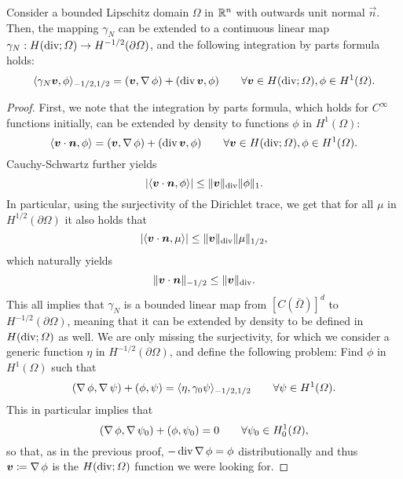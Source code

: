 \begin{theorem}\label{thm:normal-trace}
Consider a bounded Lipschitz domain $\Omega$ in $\mathbb{R}^n$ with outwards unit normal $\vec n$. Then, the mapping $\gamma_N$ can be extended to a continuous linear map $\gamma_N: H(\operatorname{\text{div}}; \Omega) \to H^{-1/2}(\partial\Omega)$, and the following integration by parts formula holds: 
\begin{equation}\label{eq:ibp-normal-trace}
    \langle \gamma_N \vec v, \phi \rangle_{-1/2, 1/2} = (\vec v, \grad \phi) + (\dive \vec v, \phi) \qquad \forall \vec v\in H(\dive;\Omega), \phi \in H^1(\Omega).
\end{equation}
\begin{proof}
First, we note that the integration by parts formula, which holds for $C^\infty$ functions initially, can be extended by density to functions $\phi$ in $H^1(\Omega)$:
\begin{equation*}
    \langle \vec v\cdot \vec n, \phi \rangle = (\vec v, \grad \phi) + (\dive \vec v, \phi) \qquad \forall \vec v\in H(\dive;\Omega), \phi \in H^1(\Omega).
\end{equation*}
Cauchy-Schwartz further yields
\begin{equation*}
    |\langle \vec v\cdot \vec n, \phi\rangle | \leq \| \vec v \|_{\dive} \| \phi \|_1.
\end{equation*}
In particular, using the surjectivity of the Dirichlet trace, we get that for all $\mu$ in $H^{1/2}(\partial\Omega)$ it also holds that
\begin{equation*}
    |\langle \vec v\cdot \vec n, \mu\rangle | \leq \| \vec v \|_{\dive} \| \mu \|_{1/2},
\end{equation*}
which naturally yields
\begin{equation*}
    \| \vec v \cdot \vec n\|_{-1/2} \leq \| \vec v\|_{\dive}.
\end{equation*}
This all implies that $\gamma_N$ is a bounded linear map from $[C(\bar\Omega)]^d$ to $H^{-1/2}(\partial\Omega)$, meaning that it can be extended by density to be defined in $H(\operatorname{\text{div}};\Omega)$ as well. We are only missing the surjectivity, for which we consider a generic function $\eta$ in $H^{-1/2}(\partial\Omega)$, and define the following problem: Find $\phi$ in $H^1(\Omega)$ such that
\begin{equation*}
    (\operatorname{\nabla} \phi, \operatorname{\nabla} \psi) + (\phi, \psi) = \langle \eta, \gamma_0 \psi \rangle_{-1/2,1/2} \qquad\forall \psi \in H^1(\Omega).
\end{equation*}
This in particular implies that 
\begin{equation*}
    (\operatorname{\nabla} \phi, \operatorname{\nabla} \psi_0) + (\phi, \psi_0) = 0 \qquad\forall \psi_0 \in H_0^1(\Omega),
\end{equation*}
so that, as in the previous proof, $-\operatorname{\text{div}} \operatorname{\nabla} \phi = \phi$ distributionally and thus $\vec v \coloneqq \grad \phi$ is the $H(\operatorname{\text{div}};\Omega)$ function we were looking for.
\end{proof}
\end{theorem}
